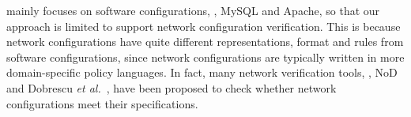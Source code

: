 \app mainly focuses on software configurations, \eg, MySQL and Apache,
so that our approach is limited to support network configuration
verification. This is because network configurations have quite
different representations, format and rules from software configurations,
since network configurations are typically written in 
more domain-specific policy languages.
In fact, many network verification tools, 
\eg, NoD~\cite{lopes15checking} and 
Dobrescu {\em et al.}~\cite{dobrescu14software},
have been proposed to check whether network configurations
meet their specifications.

